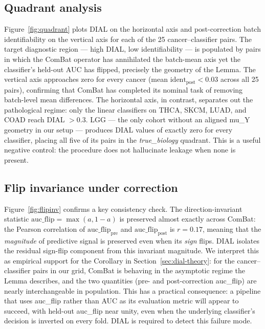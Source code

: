 \documentclass[11pt]{article}
\begin{document}
\subsection{Quadrant analysis}

Figure~\ref{fig:quadrant} plots DIAL on the horizontal axis and post-correction batch identifiability on the vertical axis for each of the 25 cancer--classifier pairs. The target diagnostic region --- high DIAL, low identifiability --- is populated by pairs in which the ComBat operator has annihilated the batch-mean axis yet the classifier's held-out AUC has flipped, precisely the geometry of the Lemma. The vertical axis approaches zero for every cancer (mean $\mathrm{ident}_{\mathrm{post}} < 0.03$ across all 25 pairs), confirming that ComBat has completed its nominal task of removing batch-level mean differences. The horizontal axis, in contrast, separates out the pathological regime: only the linear classifiers on THCA, SKCM, LUAD, and COAD reach DIAL $> 0.3$. LGG --- the only cohort without an aligned mu\_Y geometry in our setup --- produces DIAL values of exactly zero for every classifier, placing all five of its pairs in the \emph{true\_biology} quadrant. This is a useful negative control: the procedure does not hallucinate leakage when none is present.

\subsection{Flip invariance under correction}

Figure~\ref{fig:flipinv} confirms a key consistency check. The direction-invariant statistic $\mathrm{auc\_flip} = \max(a, 1-a)$ is preserved almost exactly across ComBat: the Pearson correlation of $\mathrm{auc\_flip}_{\mathrm{pre}}$ and $\mathrm{auc\_flip}_{\mathrm{post}}$ is $r = 0.17$, meaning that the \emph{magnitude} of predictive signal is preserved even when its \emph{sign} flips. DIAL isolates the residual sign-flip component from this invariant magnitude. We interpret this as empirical support for the Corollary in Section~\ref{sec:dial-theory}: for the cancer--classifier pairs in our grid, ComBat is behaving in the asymptotic regime the Lemma describes, and the two quantities (pre- and post-correction auc\_flip) are nearly interchangeable in population. This has a practical consequence: a pipeline that uses auc\_flip rather than AUC as its evaluation metric will appear to succeed, with held-out auc\_flip near unity, even when the underlying classifier's decision is inverted on every fold. DIAL is required to detect this failure mode.
\end{document}
